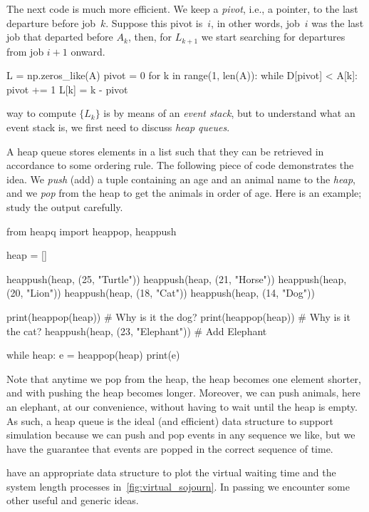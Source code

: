 \documentclass[stochastic-or.tex]{subfiles}
\begin{document}
The next  code is much more efficient. We keep a \emph{pivot}, i.e., a pointer, to the last departure before job~$k$. Suppose this pivot is~$i$, in other words, job~$i$ was the last job that departed before $A_{k}$, then, for $L_{k+1}$ we start searching for departures from job $i+1$ onward.

\begin{python}
L = np.zeros_like(A)
pivot = 0
for k in range(1, len(A)):
    while D[pivot] < A[k]:
        pivot += 1
    L[k] = k - pivot
\end{python}


 way to compute $\{L_{k}\}$ is by means of an \emph{event stack}, but to understand what an event stack is, we first need to discuss \emph{heap queues}.

A heap queue stores elements in a list such that they can be retrieved in accordance to some ordering rule.
The following piece of code demonstrates the idea.
We \emph{push} (add) a tuple containing an age and an animal name to the \emph{heap}, and we \emph{pop} from the heap to get the animals in order of age.
Here is an example; study the output carefully.

\begin{pyconsole}
from heapq import heappop, heappush

heap = []

heappush(heap, (25, "Turtle"))
heappush(heap, (21, "Horse"))
heappush(heap, (20, "Lion"))
heappush(heap, (18, "Cat"))
heappush(heap, (14, "Dog"))

print(heappop(heap)) # Why is it the dog?
print(heappop(heap)) # Why is it the cat?
heappush(heap, (23, "Elephant")) # Add Elephant

while heap:
    e = heappop(heap)
    print(e)

\end{pyconsole}

Note that anytime we pop from the heap, the heap becomes one element shorter, and with pushing the heap becomes longer.
Moreover, we can push animals, here an elephant, at our convenience, without having to wait until the heap is empty.
As such, a heap queue is the ideal (and efficient) data structure to support simulation because we can push and pop events in any sequence we like, but we have the guarantee that events are popped in the correct sequence of time.

 have an appropriate data structure to plot the virtual waiting time and the system length processes in~\cref{fig:virtual_sojourn}.
In passing we encounter some other useful and generic ideas.
\end{document}
